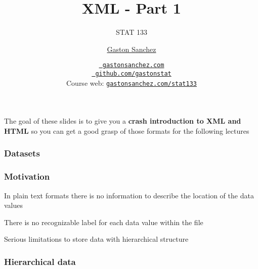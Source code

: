 \documentclass[12pt]{beamer}\usepackage[]{graphicx}\usepackage[]{color}
\title{XML - Part 1}
\subtitle{STAT 133}
\author{\href{http://www.gastonsanchez.com}{Gaston Sanchez}}
\institute{Department of Statistics, UC{\textendash}Berkeley}
\date{\href{http://www.gastonsanchez.com}{\tt \scriptsize \color{foreground} gastonsanchez.com}
\\[-4pt]
\href{http://github.com/gastonstat}{\tt \scriptsize \color{foreground} github.com/gastonstat}
\\[-4pt]
{\scriptsize Course web: \href{http://www.gastonsanchez.com/stat133}{\tt gastonsanchez.com/stat133}}
}
\begin{document}
{
  \frame{
    \titlepage
  } 
}


\begin{frame}
\begin{center}
\Huge{}
\end{center}
\end{frame}


\begin{frame}
\begin{center}

The goal of these slides is to give you a \textbf{crash introduction to XML and HTML} so you can get a good grasp of those formats for the following lectures
\eb

\end{center}
\end{frame}


\begin{frame}
\frametitle{Datasets}

\eb
\begin{center}
\end{center}

\end{frame}


\begin{frame}
\frametitle{Motivation}

\bbi
  \item In plain text formats there is no information to describe the location of the data values
  \item There is no recognizable label for each data value within the file
  \item Serious limitations to store data with hierarchical structure 
\ei
\eb

\end{frame}


\begin{frame}
\frametitle{Hierarchical data}
\begin{center}
\end{center}
\end{frame}
\end{document}
